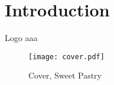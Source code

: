 \documentclass[
    ref = refDemo,
]{spBeamer}
\begin{document}
    \section{Introduction}
        \begin{frame}{Logo}
            aaa
            \begin{figure}
                \centering
                \texttt{[image: cover.pdf]}
                \caption{Cover, Sweet Pastry}
            \end{figure}
        \end{frame}
    
\end{document}
